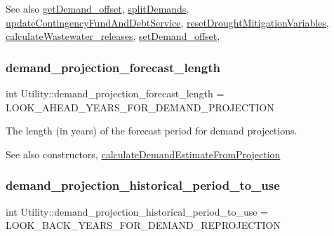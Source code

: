 \begin{DoxySeeAlso}{See also}
\mbox{\hyperlink{classUtility_acdd0e90d638d4a127a06787fe427ab59}{get\+Demand\+\_\+offset}}, \mbox{\hyperlink{classUtility_aca42b14087c3184d4fec10a2e8729c05}{split\+Demands}}, \mbox{\hyperlink{classUtility_ab663efd526505a3d843cae7075cc3b91}{update\+Contingency\+Fund\+And\+Debt\+Service}}, \mbox{\hyperlink{classUtility_af9ec9c2cb69166db021f03ce9ddf4d8e}{reset\+Drought\+Mitigation\+Variables}}, \mbox{\hyperlink{classUtility_a5feecc73d561de022eb6ba3c657b3dbc}{calculate\+Wastewater\+\_\+releases}}, \mbox{\hyperlink{classUtility_a6e7f1df1fcde0b14475c7045bdcaf218}{set\+Demand\+\_\+offset}}, 
\end{DoxySeeAlso}
\mbox{\label{classUtility_a50fd81c790bf79ac989effa1bd3edaec}} 
\subsubsection{\texorpdfstring{demand\+\_\+projection\+\_\+forecast\+\_\+length}{demand\_projection\_forecast\_length}}
{\footnotesize\ttfamily int Utility\+::demand\+\_\+projection\+\_\+forecast\+\_\+length = L\+O\+O\+K\+\_\+\+A\+H\+E\+A\+D\+\_\+\+Y\+E\+A\+R\+S\+\_\+\+F\+O\+R\+\_\+\+D\+E\+M\+A\+N\+D\+\_\+\+P\+R\+O\+J\+E\+C\+T\+I\+ON\hspace{0.3cm}{\ttfamily [private]}}



The length (in years) of the forecast period for demand projections. 

\begin{DoxySeeAlso}{See also}
constructors, \mbox{\hyperlink{classUtility_a10f96b2f34ba7e6e12a8e8fb98b8534a}{calculate\+Demand\+Estimate\+From\+Projection}} 
\end{DoxySeeAlso}
\mbox{\label{classUtility_a8a23a796bff4447ae20a1cd3e97661c1}} 
\subsubsection{\texorpdfstring{demand\+\_\+projection\+\_\+historical\+\_\+period\+\_\+to\+\_\+use}{demand\_projection\_historical\_period\_to\_use}}
{\footnotesize\ttfamily int Utility\+::demand\+\_\+projection\+\_\+historical\+\_\+period\+\_\+to\+\_\+use = L\+O\+O\+K\+\_\+\+B\+A\+C\+K\+\_\+\+Y\+E\+A\+R\+S\+\_\+\+F\+O\+R\+\_\+\+D\+E\+M\+A\+N\+D\+\_\+\+R\+E\+P\+R\+O\+J\+E\+C\+T\+I\+ON\hspace{0.3cm}{\ttfamily [private]}}



